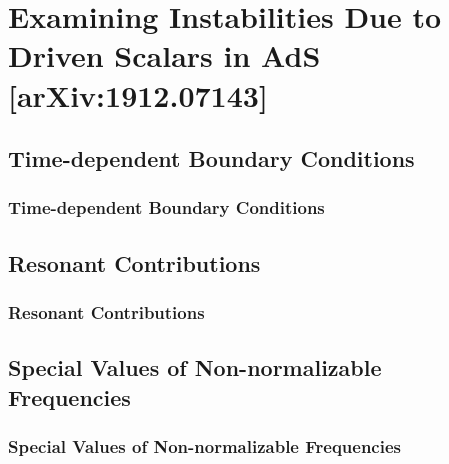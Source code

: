\documentclass[mathserif,10pt]{beamer}
\begin{document}

\section{Examining Instabilities Due to Driven Scalars in AdS [arXiv:1912.07143]}
\subsection{Time-dependent Boundary Conditions}
\frame
{
  \frametitle{Time-dependent Boundary Conditions}
}


\subsection{Resonant Contributions}
\frame
{
  \frametitle{Resonant Contributions}
}


\subsection{Special Values of Non-normalizable Frequencies}
\frame
{
  \frametitle{Special Values of Non-normalizable Frequencies}
}

\end{document}
